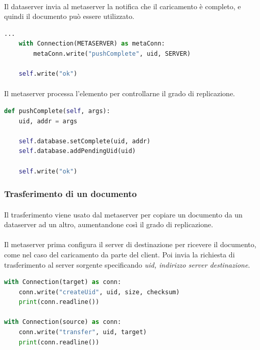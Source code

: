 \documentclass[11pt,a4paper,english]{article}
\begin{document}
\paragraph{} Il dataserver invia al metaserver la notifica che il caricamento è completo, e quindi il documento può essere utilizzato.

\begin{lstlisting}[language=Python, title=Dataserver]
    ...
    with Connection(METASERVER) as metaConn:
        metaConn.write("pushComplete", uid, SERVER)

    self.write("ok")
\end{lstlisting}

\paragraph{} Il metaserver processa l'elemento per controllarne il grado di replicazione.

\begin{lstlisting}[language=Python, title=Metaserver]
def pushComplete(self, args):
    uid, addr = args

    self.database.setComplete(uid, addr)
    self.database.addPendingUid(uid)

    self.write("ok")
\end{lstlisting}


\subsubsection{Trasferimento di un documento}

\paragraph{} Il trasferimento viene usato dal metaserver per copiare un documento da un dataserver ad un altro, aumentandone così il grado di replicazione.

\paragraph{} Il metaserver prima configura il server di destinazione per ricevere il documento, come nel caso del caricamento da parte del client. Poi invia la richiesta di trasferimento al server sorgente specificando \emph{uid, indirizzo server destinazione}.

\begin{lstlisting}[language=Python, title=Metaserver]
with Connection(target) as conn:
    conn.write("createUid", uid, size, checksum)
    print(conn.readline())

with Connection(source) as conn:
    conn.write("transfer", uid, target)
    print(conn.readline())
\end{lstlisting}
\end{document}
